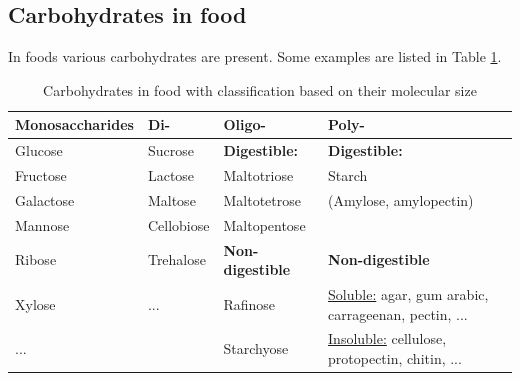 \subsection*{Carbohydrates in food}
In foods various carbohydrates are present. Some examples are listed in Table \ref{tab:L02_carbohydrates}.
\begin{table}[h]
    \centering
    \caption{Carbohydrates in food with classification based on their molecular size}
    \label{tab:L02_carbohydrates}
    \begin{tabular}{l|l|l|l}
    \textbf{Monosaccharides} & \textbf{Di-} & \textbf{Oligo-} & \textbf{Poly-} \\
    \hline
    Glucose & Sucrose & \textbf{Digestible:} & \textbf{Digestible:} \\

    Fructose & Lactose & Maltotriose & Starch \\

    Galactose & Maltose & Maltotetrose & (Amylose, amylopectin) \\

    Mannose & Cellobiose & Maltopentose & \\

    Ribose & Trehalose & \textbf{Non-digestible} & \textbf{Non-digestible} \\

    Xylose & ... & Rafinose & \underline{Soluble:} agar, gum arabic, carrageenan, pectin, ... \\
    ... & & Starchyose & \underline{Insoluble:} cellulose, protopectin, chitin, ... \\
    \end{tabular}
\end{table}

